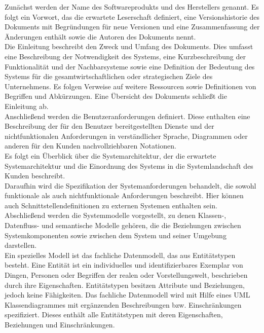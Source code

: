 Zunächst werden der Name des Softwareprodukts und des Herstellers genannt. Es folgt ein Vorwort, das die erwartete 
Leserschaft definiert, eine Versionshistorie des Dokuments mit Begründungen für neue Versionen und eine Zusammenfassung 
der Änderungen enthält sowie die Autoren des Dokuments nennt.\\
Die Einleitung beschreibt den Zweck und Umfang des Dokuments. Dies umfasst eine Beschreibung der Notwendigkeit des 
Systems, eine Kurzbeschreibung der Funktionalität und der Nachbarsysteme sowie eine Definition der Bedeutung des 
Systems für die gesamtwirtschaftlichen oder strategischen Ziele des Unternehmens. Es folgen Verweise auf weitere 
Ressourcen sowie Definitionen von Begriffen und Abkürzungen. Eine Übersicht des Dokuments schließt die Einleitung ab.\\
Anschließend werden die Benutzeranforderungen definiert. Diese enthalten eine Beschreibung der für den Benutzer 
bereitgestellten Dienste und der nichtfunktionalen Anforderungen in verständlicher Sprache, Diagrammen oder anderen 
für den Kunden nachvollziehbaren Notationen.\\
Es folgt ein Überblick über die Systemarchitektur, der die erwartete Systemarchitektur und die Einordnung des Systems 
in die Systemlandschaft des Kunden beschreibt.\\
Daraufhin wird die Spezifikation der Systemanforderungen behandelt, die sowohl funktionale als auch nichtfunktionale 
Anforderungen beschreibt. Hier können auch Schnittstellendefinitionen zu externen Systemen enthalten sein.\\
Abschließend werden die Systemmodelle vorgestellt, zu denen Klassen-, Datenfluss- und semantische Modelle gehören, 
die die Beziehungen zwischen Systemkomponenten sowie zwischen dem System und seiner Umgebung darstellen.\\

Ein spezielles Modell ist das fachliche Datenmodell, das aus Entitätstypen besteht. Eine Entität ist ein individuelles 
und identifizierbares Exemplar von Dingen, Personen oder Begriffen der realen oder Vorstellungswelt, beschrieben 
durch ihre Eigenschaften. Entitätstypen besitzen Attribute und Beziehungen, jedoch keine Fähigkeiten. Das fachliche 
Datenmodell wird mit Hilfe eines UML Klassendiagrammes mit ergänzenden Beschreibungen bzw. Einschränkungen spezifiziert.
Dieses enthält alle Entitätstypen mit deren Eigenschaften, Beziehungen und Einschränkungen.\\

